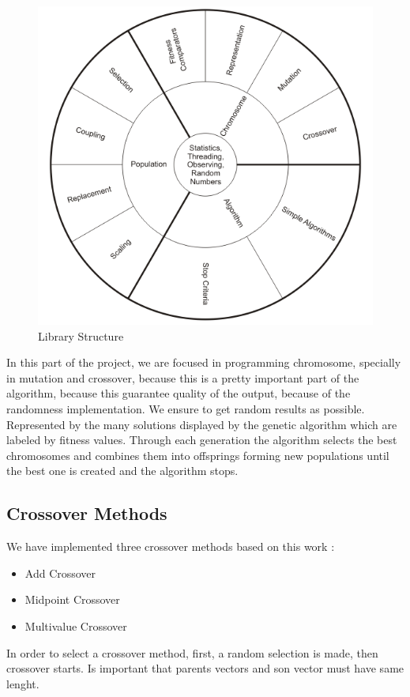 \documentclass[letterpaper]{article}
\begin{document}
\begin{figure}
\centering
\includegraphics[width=0.7\linewidth]{images/estructura.png}
\caption{Library Structure}
\label{F:estructura}
\end{figure}

In this part of the project, we are focused in programming chromosome, specially in mutation and crossover, because this is a pretty important part of the algorithm, because this guarantee quality of the output, because of the randomness implementation. We ensure to get random results as possible.\\

Represented by the many solutions displayed by the genetic algorithm which are labeled by fitness values. Through each generation the algorithm selects the best chromosomes and combines them into offsprings forming new populations until the best one is created and the algorithm stops.

\subsection{Crossover Methods}

We have implemented three crossover methods based on this work \cite{code}:\\

\begin{itemize}
\item Add Crossover
\item Midpoint Crossover
\item Multivalue Crossover
\end{itemize}

In order to select a crossover method, first, a random selection is made, then crossover starts. Is important that parents vectors and son vector must have same lenght.\\
\end{document}
